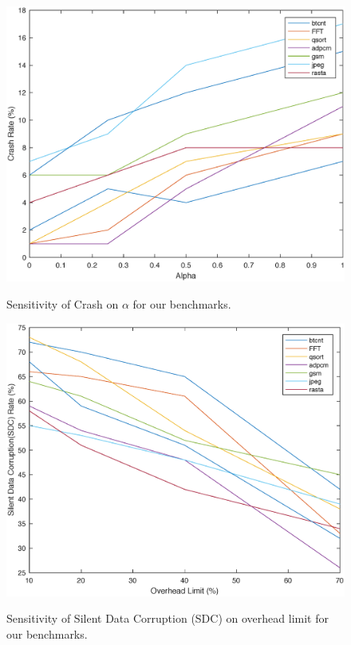 \begin{figure}[!t]
\begin{center}
{\label{fig:plan_14}\includegraphics[scale=0.32]{./figures/figure10.eps}}
\end{center}
\caption{Sensitivity of Crash on $\alpha$ for our benchmarks.}
\label{fig:plan_14}
\end{figure}

\begin{figure}[!t]
\begin{center}
{\label{fig:plan_15}\includegraphics[scale=0.32]{./figures/figure11.eps}}
\end{center}
\caption{Sensitivity of Silent Data Corruption (SDC) on overhead limit for our benchmarks.}
\label{fig:plan_15}
\end{figure}

